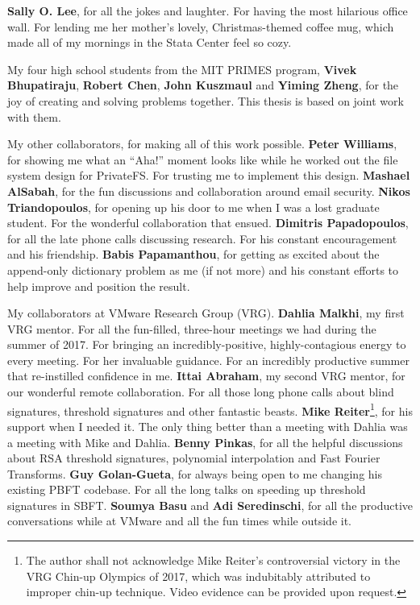 \textbf{Sally O. Lee}, for all the jokes and laughter.
For having the most hilarious office wall.
For lending me her mother's lovely, Christmas-themed coffee mug, which made all of my mornings in the Stata Center feel so cozy.

My four high school students from the MIT PRIMES program, \textbf{Vivek Bhupatiraju}, \textbf{Robert Chen}, \textbf{John Kuszmaul} and \textbf{Yiming Zheng}, for the joy of creating and solving problems together.
This thesis is based on joint work with them.

My other collaborators, for making all of this work possible.
\textbf{Peter Williams}, for showing me what an ``Aha!'' moment looks like while he worked out the file system design for PrivateFS.
For trusting me to implement this design.
\textbf{Mashael AlSabah}, for the fun discussions and collaboration around email security.
\textbf{Nikos Triandopoulos}, for opening up his door to me when I was a lost graduate student.
For the wonderful collaboration that ensued.
\textbf{Dimitris Papadopoulos}, for all the late phone calls discussing research.
For his constant encouragement and his friendship.
\textbf{Babis Papamanthou}, for getting as excited about the append-only dictionary problem as me (if not more) and his constant efforts to help improve and position the result.

My collaborators at VMware Research Group (VRG).
\textbf{Dahlia Malkhi}, my first VRG mentor.
For all the fun-filled, three-hour meetings we had during the summer of 2017.
For bringing an incredibly-positive, highly-contagious energy to every meeting.
For her invaluable guidance.
For an incredibly productive summer that re-instilled confidence in me.
\textbf{Ittai Abraham}, my second VRG mentor, for our wonderful remote collaboration.
For all those long phone calls about blind signatures, threshold signatures and other fantastic beasts.
\textbf{Mike Reiter}\footnote{The author shall not acknowledge Mike Reiter's controversial victory in the VRG Chin-up Olympics of 2017, which was indubitably attributed to improper chin-up technique. Video evidence can be provided upon request.}, for his support when I needed it.
The only thing better than a meeting with Dahlia was a meeting with Mike and Dahlia.
\textbf{Benny Pinkas}, for all the helpful discussions about RSA threshold signatures, polynomial interpolation and Fast Fourier Transforms.
\textbf{Guy Golan-Gueta}, for always being open to me changing his existing PBFT codebase.
For all the long talks on speeding up threshold signatures in SBFT.
\textbf{Soumya Basu} and \textbf{Adi Seredinschi}, for all the productive conversations while at VMware and all the fun times while outside it.


